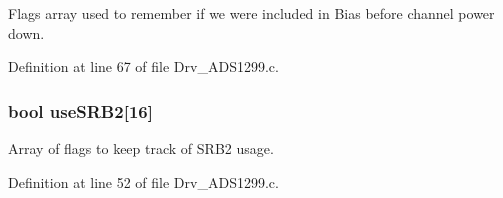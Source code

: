 Flags array used to remember if we were included in Bias before channel power down. 



Definition at line 67 of file Drv\+\_\+\+A\+D\+S1299.\+c.

\subsubsection[{\texorpdfstring{use\+S\+R\+B2}{useSRB2}}]{\setlength{\rightskip}{0pt plus 5cm}bool use\+S\+R\+B2\mbox{[}16\mbox{]}}\hypertarget{group__ADS1299__Library_ga96bc68ed80305391fa5bbcc88557d776}{}\label{group__ADS1299__Library_ga96bc68ed80305391fa5bbcc88557d776}


Array of flags to keep track of S\+R\+B2 usage. 



Definition at line 52 of file Drv\+\_\+\+A\+D\+S1299.\+c.

